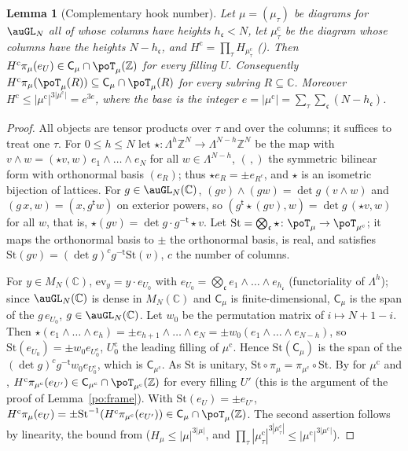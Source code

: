 \documentclass[10pt]{amsart}
\newtheorem{lemma}[theorem]{Lemma}
\theoremstyle{definition}
\theoremstyle{remark}
\newcommand{\C}{\mathbb C}
\newcommand{\Z}{\mathbb Z}
\begin{document}
\begin{lemma}[Complementary hook number]\label{pfq:hook}
Let $\mu=(\mu_\tau)$ be diagrams for $\auGL_N$ all of whose columns have heights $h_{\mathfrak c}<N$, let
$\mu^{\mathrm c}_\tau$ be the diagram whose columns have the heights $N-h_{\mathfrak c}$, and
$H^{\mathrm c}=\prod_\tau H_{\mu^{\mathrm c}_\tau}$ ({\cite[Lemma~5.22]{P49}}). Then
$H^{\mathrm c}\pi_\mu(e_U)\in\mathsf C_\mu\cap\poT_\mu(\Z)$ for every filling $U$. Consequently
$H^{\mathrm c}\pi_\mu(\poT_\mu(R))\subseteq\mathsf C_\mu\cap\poT_\mu(R)$ for every subring $R\subseteq\C$.
Moreover $H^{\mathrm c}\le |\mu^{\mathrm c}|^{3|\mu^{\mathrm c}|}=e^{3e}$, where the base is the integer $e=|\mu^{\mathrm c}|=\sum_\tau\sum_{\mathfrak c}(N-h_{\mathfrak c})$.
\end{lemma}
\begin{proof}
All objects are tensor products over $\tau$ and over the columns; it suffices to treat one $\tau$. For
$0\le h\le N$ let $\star\colon\Lambda^h\Z^N\to\Lambda^{N-h}\Z^N$ be the map with $v\wedge w=(\star v,w)\,
e_1\wedge\dots\wedge e_N$ for all $w\in\Lambda^{N-h}$, $(\,,)$ the symmetric bilinear form with orthonormal
basis $(e_R)$; thus $\star e_R=\pm e_{R^c}$, and $\star$ is an isometric bijection of lattices. For
$g\in\auGL_N(\C)$, $(gv)\wedge(gw)=\det g\,(v\wedge w)$ and $(g\,x,w)=(x,g^{\mathsf t}w)$ on exterior powers, so
$(g^{\mathsf t}\star(gv),w)=\det g\,(\star v,w)$ for all $w$, that is, $\star(gv)=\det g\cdot g^{-\mathsf t}\star v$.
Let $\mathrm{St}=\bigotimes_{\mathfrak c}\star\colon\poT_\mu\to\poT_{\mu^{\mathrm c}}$; it maps the orthonormal
basis to $\pm$ the orthonormal basis, is real, and satisfies $\mathrm{St}(gv)=(\det g)^{c}g^{-\mathsf t}\mathrm{St}(v)$,
$c$ the number of columns.

For $y\in M_N(\C)$, $\mathrm{ev}_y=y\cdot e_{U_0}$ with $e_{U_0}=\bigotimes_{\mathfrak c}e_1\wedge\dots\wedge e_{h_{\mathfrak c}}$
(functoriality of $\Lambda^h$); since $\auGL_N(\C)$ is dense in $M_N(\C)$ and $\mathsf C_\mu$ is finite-dimensional,
$\mathsf C_\mu$ is the span of the $g\,e_{U_0}$, $g\in\auGL_N(\C)$. Let $w_0$ be the permutation matrix of
$i\mapsto N+1-i$. Then $\star(e_1\wedge\dots\wedge e_h)=\pm e_{h+1}\wedge\dots\wedge e_N=\pm w_0(e_1\wedge\dots\wedge e_{N-h})$,
so $\mathrm{St}(e_{U_0})=\pm w_0e_{U_0^{\mathrm c}}$, $U_0^{\mathrm c}$ the leading filling of $\mu^{\mathrm c}$. Hence
$\mathrm{St}(\mathsf C_\mu)$ is the span of the $(\det g)^cg^{-\mathsf t}w_0e_{U^{\mathrm c}_0}$, which is
$\mathsf C_{\mu^{\mathrm c}}$. As $\mathrm{St}$ is unitary, $\mathrm{St}\circ\pi_\mu=\pi_{\mu^{\mathrm c}}\circ\mathrm{St}$.
By {\cite[Lemma~5.22]{P49}} for $\mu^{\mathrm c}$ and {\cite[(51)]{P49}}, $H^{\mathrm c}\pi_{\mu^{\mathrm c}}(e_{U'})\in
\mathsf C_{\mu^{\mathrm c}}\cap\poT_{\mu^{\mathrm c}}(\Z)$ for every filling $U'$ (this is the argument of the
proof of Lemma~\ref{po:frame}). With $\mathrm{St}(e_U)=\pm e_{U'}$,
$H^{\mathrm c}\pi_\mu(e_U)=\pm\mathrm{St}^{-1}(H^{\mathrm c}\pi_{\mu^{\mathrm c}}(e_{U'}))\in\mathsf C_\mu\cap\poT_\mu(\Z)$.
The second assertion follows by linearity, the bound from {\cite[Lemma~5.22]{P49}} ($H_\mu\le|\mu|^{3|\mu|}$,
and $\prod_\tau|\mu^{\mathrm c}_\tau|^{3|\mu^{\mathrm c}_\tau|}\le |\mu^{\mathrm c}|^{3|\mu^{\mathrm c}|}$).
\end{proof}
\end{document}
